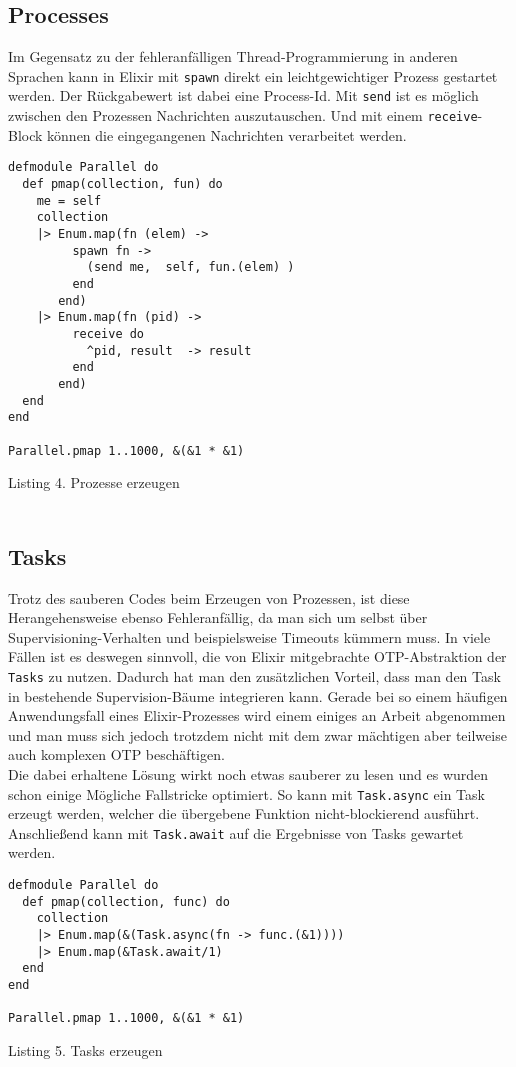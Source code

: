 \documentclass[10pt,journal,compsoc]{IEEEtran}
\begin{document}
\subsection{Processes}
Im Gegensatz zu der fehleranfälligen Thread-Programmierung in anderen Sprachen kann in Elixir mit \texttt{spawn} direkt ein leichtgewichtiger Prozess gestartet werden. Der Rückgabewert ist dabei eine Process-Id. Mit \texttt{send} ist es möglich zwischen den Prozessen Nachrichten auszutauschen. Und mit einem \texttt{receive}-Block können die eingegangenen Nachrichten verarbeitet werden.\\
\begin{lstlisting}
defmodule Parallel do
  def pmap(collection, fun) do
    me = self
    collection
    |> Enum.map(fn (elem) ->
         spawn fn -> 
           (send me,  self, fun.(elem) )
         end
       end)
    |> Enum.map(fn (pid) ->
         receive do
           ^pid, result  -> result
         end
       end)
  end
end

Parallel.pmap 1..1000, &(&1 * &1)
\end{lstlisting}
\small{Listing 4. Prozesse erzeugen}\\
~\\

\subsection{Tasks}
Trotz des sauberen Codes beim Erzeugen von Prozessen, ist diese Herangehensweise ebenso Fehleranfällig, da man sich um selbst über Supervisioning-Verhalten und beispielsweise Timeouts kümmern muss. In viele Fällen ist es deswegen sinnvoll, die von Elixir mitgebrachte OTP-Abstraktion der \texttt{Tasks} zu nutzen. Dadurch hat man den zusätzlichen Vorteil, dass man den Task in bestehende Supervision-Bäume integrieren kann. Gerade bei so einem häufigen Anwendungsfall eines Elixir-Prozesses wird einem einiges an Arbeit abgenommen und man muss sich jedoch trotzdem nicht mit dem zwar mächtigen aber teilweise auch komplexen OTP beschäftigen.\\
Die dabei erhaltene Lösung wirkt noch etwas sauberer zu lesen und es wurden schon einige Mögliche Fallstricke optimiert. So kann mit \texttt{Task.async} ein Task erzeugt werden, welcher die übergebene Funktion nicht-blockierend ausführt. Anschließend kann mit \texttt{Task.await} auf die Ergebnisse von Tasks gewartet werden.
\begin{lstlisting}
defmodule Parallel do
  def pmap(collection, func) do
    collection
    |> Enum.map(&(Task.async(fn -> func.(&1))))
    |> Enum.map(&Task.await/1)
  end
end

Parallel.pmap 1..1000, &(&1 * &1)
\end{lstlisting}
\small{Listing 5. Tasks erzeugen}\\
~\\
\end{document}
